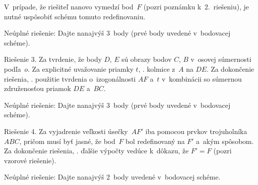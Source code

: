{\item{}V~prípade, že riešiteľ nanovo vymedzí bod~$F$ (pozri poznámku k~2.~riešeniu),
je nutné uspôsobiť schému tomuto redefinovaniu.

\item{}Neúplné riešenie:
Dajte nanajvýš 3~body (prvé body uvedené v~bodovacej schéme).

\smallskip
{Riešenie 3.}
\* [1 bod] Za tvrdenie, že body $D$, $E$ sú obrazy bodov $C$, $B$ v~osovej súmernosti podľa~$o$.
\* [2 body] Za explicitné uvažovanie priamky $t$, \tj. kolmice z~$A$ na $DE$.
\* [3 body] Za dokončenie riešenia, \tj. použitie tvrdenia
o~izogonálnosti $AF$ a~$t$ v~kombinácii so súmernou združenosťou priamok $DE$ a~$BC$.

\item{}Neúplné riešenie:
Dajte nanajvýš 3~body (prvé body uvedené v~bodovacej schéme).

\smallskip
{Riešenie 4.}
\* [2 body] Za vyjadrenie veľkosti úsečky~$AF'$ iba pomocou
prvkov trojuholníka $ABC$, pričom musí byť jasné, že bod~$F$ bol
redefinovaný na $F'$ a~akým spôsobom.\nopagebreak
\* [4 body] Za dokončenie riešenia, \tj. ďalšie výpočty
vedúce k~dôkazu, že $F'= F$ (pozri vzorové riešenie).

\nopagebreak
\item{}Neúplné riešenie:
Dajte nanajvýš 2~body uvedené v~bodovacej schéme.
\endpetit\bigskip}

